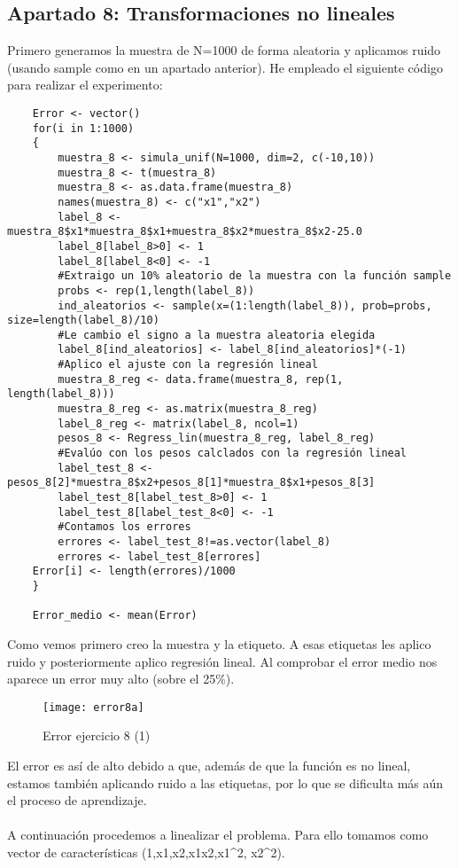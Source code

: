 	\subsection{Apartado 8: Transformaciones no lineales}
	Primero generamos la muestra de N=1000 de forma aleatoria y aplicamos ruido (usando sample como en un apartado anterior). He empleado el siguiente código para realizar el experimento:
	\begin{lstlisting}
	Error <- vector()
	for(i in 1:1000)
	{
		muestra_8 <- simula_unif(N=1000, dim=2, c(-10,10))
		muestra_8 <- t(muestra_8)
		muestra_8 <- as.data.frame(muestra_8)
		names(muestra_8) <- c("x1","x2")
		label_8 <- muestra_8$x1*muestra_8$x1+muestra_8$x2*muestra_8$x2-25.0
		label_8[label_8>0] <- 1
		label_8[label_8<0] <- -1
		#Extraigo un 10% aleatorio de la muestra con la función sample
		probs <- rep(1,length(label_8))
		ind_aleatorios <- sample(x=(1:length(label_8)), prob=probs, size=length(label_8)/10)
		#Le cambio el signo a la muestra aleatoria elegida
		label_8[ind_aleatorios] <- label_8[ind_aleatorios]*(-1)
		#Aplico el ajuste con la regresión lineal
		muestra_8_reg <- data.frame(muestra_8, rep(1, length(label_8)))
		muestra_8_reg <- as.matrix(muestra_8_reg)
		label_8_reg <- matrix(label_8, ncol=1)
		pesos_8 <- Regress_lin(muestra_8_reg, label_8_reg)
		#Evalúo con los pesos calclados con la regresión lineal
		label_test_8 <- pesos_8[2]*muestra_8$x2+pesos_8[1]*muestra_8$x1+pesos_8[3]
		label_test_8[label_test_8>0] <- 1
		label_test_8[label_test_8<0] <- -1
		#Contamos los errores
		errores <- label_test_8!=as.vector(label_8)
		errores <- label_test_8[errores]
	Error[i] <- length(errores)/1000
	}
	
	Error_medio <- mean(Error)
	\end{lstlisting}
	
	Como vemos primero creo la muestra y la etiqueto. A esas etiquetas les aplico ruido y posteriormente aplico regresión lineal. Al comprobar el error medio nos aparece un error muy alto (sobre el 25\%).
	\begin{figure} [H]
	\centering
	\texttt{[image: error8a]}
	\caption{Error ejercicio 8 (1)}
	\label{fig:error8a}
	\end{figure}
	
	El error es así de alto debido a que, además de que la función es no lineal, estamos también aplicando ruido a las etiquetas, por lo que se dificulta más aún el proceso de aprendizaje.
	\\
	\\
	A continuación procedemos a linealizar el problema. Para ello tomamos como vector de características (1,x1,x2,x1x2,x1^2, x2^2).
	
